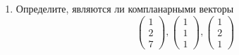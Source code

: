{\begin{enumerate}
		\item Определите, являются ли компланарными векторы
		\[
			\begin{pmatrix}
				1 \\ 2 \\ 7
			\end{pmatrix},
			\begin{pmatrix}
				1 \\ 1 \\ 1
			\end{pmatrix},
			\begin{pmatrix}
				1 \\ 2 \\ 1
			\end{pmatrix}
		\]

		
    \end{enumerate}
}


